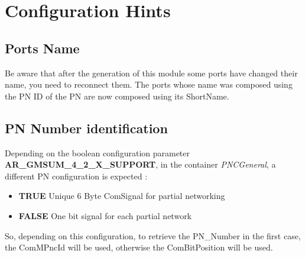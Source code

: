 \section{Configuration Hints}

\subsection{Ports Name}
Be aware that after the generation of this module some ports have changed their name, you need to reconnect them. The ports whose name was composed using the PN ID of the PN are now composed using its ShortName.

\subsection{PN Number identification}
Depending on the boolean configuration parameter \textbf{AR\_GMSUM\_4\_2\_X\_SUPPORT}, in the container \textit{PNCGeneral}, a different PN configuration is expected :
\begin{itemize}
  \item \textbf{TRUE}  Unique 6 Byte ComSignal for partial networking
  \item \textbf{FALSE} One bit signal for each partial network
\end{itemize}

So, depending on this configuration, to retrieve the PN\_Number in the first case, the ComMPncId will be used, otherwise the ComBitPosition will be used.

